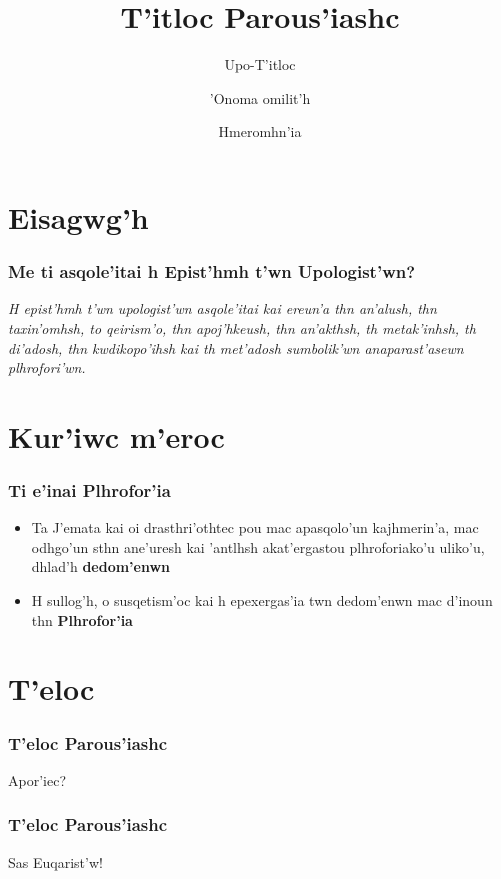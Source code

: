 \documentclass{beamer}
\title[T'itloc Parous'iachc (S'untomoc)]{T'itloc Parous'iashc}
\subtitle{Upo-T'itloc}
\author{'Onoma omilit'h}
\institute[]{'Onoma instito'utou/etaire'iac}
\date{Hmeromhn'ia}
\begin{document}
\begin{frame}
\titlepage
\end{frame}

\section{Eisagwg'h}

\begin{frame}
 \frametitle{Me ti asqole'itai h Epist'hmh t'wn Upologist'wn?}
\noindent
 \textit{H epist'hmh t'wn upologist'wn asqole'itai kai ereun'a thn an'alush, thn taxin'omhsh, to qeirism'o, thn apoj'hkeush, thn an'akthsh, th metak'inhsh, th di'adosh, thn kwdikopo'ihsh kai th met'adosh sumbolik'wn anaparast'asewn plhrofori'wn.}
\end{frame}

\section{Kur'iwc m'eroc}

\begin{frame}
 \frametitle{Ti e'inai Plhrofor'ia}
\begin{itemize}
 \item Ta J'emata kai oi drasthri'othtec pou mac apasqolo'un kajhmerin'a, mac odhgo'un sthn ane'uresh kai 'antlhsh akat'ergastou plhroforiako'u uliko'u, dhlad'h \textbf{dedom'enwn}
 \item H sullog'h, o susqetism'oc kai h epexergas'ia twn dedom'enwn mac d'inoun thn \textbf{Plhrofor'ia}
\end{itemize}
\end{frame}

\section{T'eloc}

\begin{frame}
 \frametitle{T'eloc Parous'iashc}
Apor'iec?
\end{frame}

\begin{frame}
 \frametitle{T'eloc Parous'iashc}
Sas Euqarist'w!
\end{frame}
\end{document}

